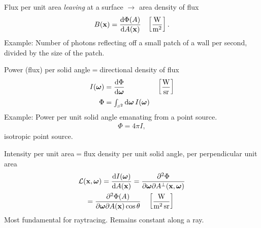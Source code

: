 \begin{compactdesc}
			Flux per unit area \emph{leaving} at a surface $\to$ area density of flux
			\begin{align*}
				B(\bm{\mathrm{x}})=\frac{\mathrm d \Phi(A)}{\mathrm d A(\bm{\mathrm{x}})} &&\left[ \frac{\si{\watt}}{\si{\meter\squared}} \right].
			\end{align*}
			Example: Number of photons reflecting off a small patch of a wall per second, divided by the size of the patch. 		\item[\lp{Radiant intensity}]
			Power (flux) per solid angle$=$directional density of flux
			\begin{align*}
				I(\vtr{\omega})&=\dv{\Phi}{\vtr{\omega}}&& \left[ \frac{\si{\watt}}{\si{\steradian}} \right]\\
				\Phi&={\scriptstyle\int_{S^2}^{}}\dd{\vtr{\omega}}\, I(\vtr{\omega})
			\end{align*}
			Example: Power per unit solid angle emanating from a point source.
			\begin{gather*}
				\Phi=4\pi I,
			\end{gather*}
			isotropic point source.
		\item[\lp{Radiance}]
			Intensity per unit area$=$flux density per unit solid angle, per perpendicular unit area
			\begin{align*}
				&\mathcal{L}(\vtr{x},\vtr{\omega})=\dv{I(\vtr{\omega})}{A(\vtr{x})}
				=\pdvv{\Phi}{\vtr{\omega}}{A^{\perp}(\vtr{x},\vtr{\omega})}\\
				&\quad=\pdvv{\Phi(A)}{\vtr{\omega}}{A(\vtr{x})\cos\theta}\quad \left[ \frac{\si{\watt}}{\si{\meter\squared\steradian}} \right]
			\end{align*}
			Most fundamental for raytracing. Remains constant along a ray.

\end{compactdesc}
